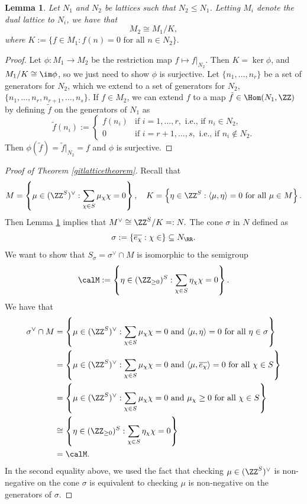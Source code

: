 \documentclass[12pt]{amsart}
\theoremstyle{plain}
\newtheorem{lemma}[theorem]{Lemma}
\begin{document}
\begin{lemma}\label{duallatticesublattice}
Let $N_1$ and $N_2$ be lattices such that $N_2 \le N_1$.
Letting $M_i$ denote the dual lattice to $N_i$, we have that
$$M_2 \cong M_1 / K,$$
where $K:= \{f \in M_1 : f(n) = 0 \text{ for all } n \in N_2\}.$
\end{lemma}
\begin{proof}
Let $\phi : M_1 \to M_2$ be the restriction map $f \mapsto \left. f \right|_{N_2}$.
Then $K = \ker \phi$, and $M_1 / K \cong \im \phi$, so we just need to show $\phi$ is surjective.
Let $\{n_1, \ldots, n_r\}$ be a set of generators for $N_2$, which we extend to a set of generators for $N_2$, $\{n_1, \ldots, n_r, n_{r+1}, \ldots, n_s\}$.
If $f \in M_2$, we can extend $f$ to a map $\tilde f \in \Hom(N_1, \ZZ)$ by defining $\tilde f$ on the generators of $N_1$ as
$$\tilde f(n_i) := \begin{cases} f(n_i) & \text{if } i = 1, \ldots, r, \text{ i.e., if } n_i \in N_2, \\ 0 & \text{if } i = r+1, \ldots, s, \text{ i.e., if } n_i \notin N_2. \end{cases}$$
Then $\phi(\tilde f) = \tilde f \big|_{N_2} = f$ and $\phi$ is surjective.
\end{proof}

\begin{proof}[{Proof of Theorem \ref{gitlatticetheorem}}]
Recall that 
$$M = \left\{\mu \in (\ZZ^S)^\vee : \sum_{\chi \in S} \mu_\chi \chi = 0 \right\}, \quad K = \left\{\eta \in \ZZ^S : \langle \mu, \eta \rangle = 0 \text{ for all } \mu \in M\right\}.$$
Then Lemma \ref{duallatticesublattice} implies that $M^\vee \cong \ZZ^S / K =: N.$
The cone $\sigma$ in $N$ defined as 
$$\sigma := \{\overline{e_\chi} : \chi \in \} \subseteq N_\RR.$$
We want to show that $S_\sigma = \sigma^\vee \cap M$ is isomorphic to the semigroup
$$\calM := \left\{ \eta \in (\ZZ_{\ge 0})^S : \sum_{\chi \in S} \eta_\chi \chi = 0\right\}.$$
We have that
\begin{align*}
	\sigma^\vee \cap M &= \left\{\mu \in (\ZZ^S)^\vee : \sum_{\chi \in S} \mu_\chi \chi = 0 \text{ and } \langle \mu, \eta \rangle = 0 \text{ for all } \eta \in \sigma \right\}\\
	&= \left\{\mu \in (\ZZ^S)^\vee : \sum_{\chi \in S} \mu_\chi \chi = 0 \text{ and } \langle \mu, \overline{e_\chi} \rangle = 0 \text{ for all } \chi \in S \right\}\\
	&= \left\{\mu \in (\ZZ^S)^\vee : \sum_{\chi \in S} \mu_\chi \chi = 0 \text{ and } \mu_\chi \ge 0 \text{ for all } \chi \in S \right\}\\
	&\cong  \left\{ \eta \in (\ZZ_{\ge 0})^S : \sum_{\chi \in S} \eta_\chi \chi = 0\right\} \\
	&=\calM.
\end{align*}
In the second equality above, we used the fact that checking $\mu \in (\ZZ^S)^\vee$ is non-negative on the cone $\sigma$ is equivalent to checking $\mu$ is non-negative on the generators of $\sigma$.
\end{proof}
\end{document}

